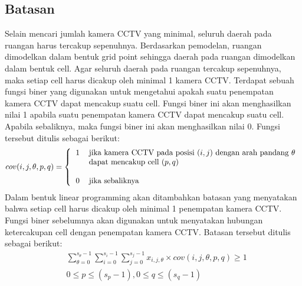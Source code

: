 \subsection{Batasan}
Selain mencari jumlah kamera CCTV yang minimal, seluruh daerah pada ruangan harus tercakup sepenuhnya. Berdasarkan pemodelan, ruangan dimodelkan dalam bentuk grid point sehingga daerah pada ruangan dimodelkan dalam bentuk cell. Agar seluruh daerah pada ruangan tercakup sepenuhnya, maka setiap cell harus dicakup oleh minimal 1 kamera CCTV. Terdapat sebuah fungsi biner yang digunakan untuk mengetahui apakah suatu penempatan kamera CCTV dapat mencakup suatu cell. Fungsi biner ini akan menghasilkan nilai 1 apabila suatu penempatan kamera CCTV dapat mencakup suatu cell. Apabila sebaliknya, maka fungsi biner ini akan menghasilkan nilai 0. Fungsi tersebut ditulis sebagai berikut:
\begin{equation*}
	cov(i,j,\theta,p,q) =
	\left \{
		\begin{tabular}{cl}
			1 & jika kamera CCTV pada posisi $(i,j)$ dengan arah pandang $\theta$\\
  			  & dapat mencakup cell $(p,q)$\\
  			  & \\
  			0 & jika sebaliknya
		\end{tabular}
	\right.
\end{equation*}
Dalam bentuk linear programming akan ditambahkan batasan yang menyatakan bahwa setiap cell harus dicakup oleh minimal 1 penempatan kamera CCTV. Fungsi biner sebelumnya akan digunakan untuk menyatakan hubungan ketercakupan cell dengan penempatan kamera CCTV. Batasan tersebut ditulis sebagai berikut:
\begin{equation*}
	\begin{split}
		& \sum_{\theta=0}^{s_{\theta}-1} \sum_{i=0}^{s_i-1} \sum_{j=0}^{s_j-1} x_{i,j,\theta} \times cov(i,j,\theta,p,q) \geq 1\\
		& 0 \leq p \leq (s_p - 1), 0 \leq q \leq (s_q - 1)
	\end{split}
\end{equation*}

